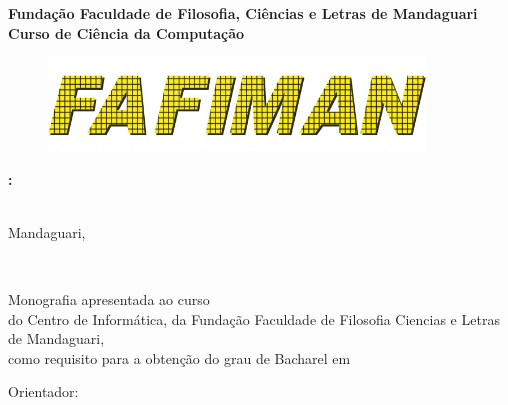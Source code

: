 \documentclass{tcc}
\begin{document}
\pagestyle{empty} %


\begin{center}
\LARGE{\bf
Fundação Faculdade de Filosofia, Ciências e Letras de Mandaguari
}\\
\Large{\bf
    Curso de Ciência da Computação
}
\end{center}
\begin{figure}[H]
\vspace*{3cm}
\centering
\includegraphics[width=100mm]{imagens/logo2.jpg}
\vspace*{3cm}
\end{figure}


\begin{center}
\LARGE{\bf \thetitle:}\\
\Large{\bf \subtitulo}\\
\end{center}

\vspace{1em}

\vfill

\vspace{2in}

\begin{center}
\bf\theauthor
\vspace*{2cm}
\end{center}

\begin{center}
Mandaguari, \the\year
\end{center}
\afterpage{\blankpage \addtocounter{page}{1}} %

\newpage
\begin{center}
\theauthor
\end{center}
\vspace{3in}
\begin{center}
\LARGE{\thetitle}\\
\end{center}

\vspace{2in}

\begin{flushright}
Monografia apresentada ao curso \nomedocurso \\ do Centro de Informática, da Fundação Faculdade de Filosofia Ciencias e Letras de Mandaguari, \\ como requisito para a obtenção do grau de Bacharel em \titulobar
\\
\vspace{0.2in}

Orientador: \orientador


\end{flushright}
\end{document}
